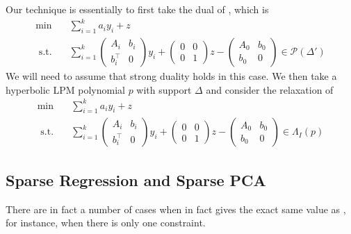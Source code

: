\documentclass{amsart}
\theoremstyle{definition}
\renewcommand{\P}{\mathcal{P}}
\newcommand{\st}{{\text{ s.t. }}}
\begin{document}
Our technique is essentially to first take the dual of , which is 
\begin{equation}\label{eq:dual}
    \begin{aligned}
        \min\quad & \sum_{i=1}^k a_i y_i + z\\
        \st & \sum_{i=1}^k \begin{pmatrix}
            A_i & b_i\\
            b_i^{\intercal} & 0
        \end{pmatrix} y_i + 
        \begin{pmatrix}
            0 & 0\\
            0 & 1
        \end{pmatrix} z
        - 
        \begin{pmatrix}
            A_0 & b_0\\
            b_0 & 0
        \end{pmatrix}
        \in \P(\Delta')
    \end{aligned}
\end{equation}
We will need to assume that strong duality holds in this case.
We then take a hyperbolic LPM polynomial $p$ with support $\Delta$ and consider the relaxation of 
\begin{equation}\label{eq:dual}
    \begin{aligned}
        \min\quad & \sum_{i=1}^k a_i y_i + z\\
        \st & \sum_{i=1}^k \begin{pmatrix}
            A_i & b_i\\
            b_i^{\intercal} & 0
        \end{pmatrix} y_i + 
        \begin{pmatrix}
            0 & 0\\
            0 & 1
        \end{pmatrix} z
        - 
        \begin{pmatrix}
            A_0 & b_0\\
            b_0 & 0
        \end{pmatrix}
        \in \Lambda_I(p)
    \end{aligned}
\end{equation}
\subsection{Sparse Regression and Sparse PCA}
There are in fact a number of cases when  in fact gives the exact same value as , for instance, when there is only one constraint.
\end{document}
